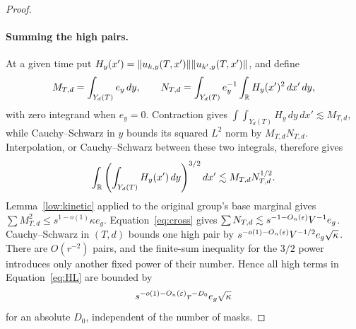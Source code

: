 \begin{proof}
\paragraph{Summing the high pairs.}
At a given time put
$H_y(x')=\lVert u_{k,y}(T,x')\rVert\lVert u_{k',y}(T,x')\rVert$, and define
\[
 M_{T,d}=\int_{Y_d(T)}e_y\,dy,\qquad
 N_{T,d}=\int_{Y_d(T)}e_y^{-1}
                    \int_\mathbb R H_y(x')^2\,dx'\,dy,
\]
with zero integrand when $e_y=0$. Contraction gives
$\int\int_{Y_d(T)}H_y\,dy\,dx'\lesssim M_{T,d}$, while
Cauchy--Schwarz in $y$ bounds its squared $L^2$ norm by
$M_{T,d}N_{T,d}$. Interpolation, or Cauchy--Schwarz between these two
integrals, therefore gives
\[
 \int_\mathbb R\left(\int_{Y_d(T)}H_y(x')\,dy\right)^{3/2}dx'
 \lesssim M_{T,d}N_{T,d}^{1/2}.
\]
Lemma~\ref{low:kinetic} applied to the original group's base marginal
gives $\sum M_{T,d}^2\leq s^{1-o(1)}\kappa e_g$.
Equation~\eqref{eq:cross} gives
$\sum N_{T,d}\lesssim s^{-1-O_n(\varepsilon)}V^{-1}e_g$.
Cauchy--Schwarz in $(T,d)$ bounds one high pair by
$s^{-o(1)-O_n(\varepsilon)}V^{-1/2}e_g\sqrt\kappa$.
There are $O(r^{-2})$ pairs, and the finite-sum inequality for the
$3/2$ power introduces only another fixed power of their number.
Hence all high terms in Equation~\eqref{eq:HL} are bounded by
\[
 s^{-o(1)-O_n(\varepsilon)}r^{-D_0}e_g\sqrt\kappa
\]
for an absolute $D_0$, independent of the number of masks.


\end{proof}

